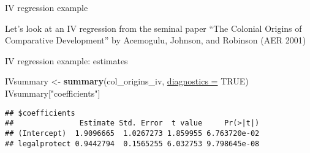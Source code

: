 \documentclass[ignorenonframetext,]{beamer}
\newenvironment{Shaded}{\begin{snugshade}}{\end{snugshade}}
\newcommand{\KeywordTok}[1]{\textcolor[rgb]{0.26,0.66,0.93}{\textbf{#1}}}
\newcommand{\DataTypeTok}[1]{\textcolor[rgb]{0.74,0.68,0.62}{\underline{#1}}}
\newcommand{\DecValTok}[1]{\textcolor[rgb]{0.27,0.67,0.26}{#1}}
\newcommand{\StringTok}[1]{\textcolor[rgb]{0.02,0.61,0.04}{#1}}
\newcommand{\OtherTok}[1]{\textcolor[rgb]{0.74,0.68,0.62}{#1}}
\newcommand{\OperatorTok}[1]{\textcolor[rgb]{0.74,0.68,0.62}{#1}}
\newcommand{\NormalTok}[1]{\textcolor[rgb]{0.74,0.68,0.62}{#1}}
\begin{document}
\begin{frame}[fragile]{IV regression example}

Let's look at an IV regression from the seminal paper ``The Colonial
Origins of Comparative Development'' by Acemogulu, Johnson, and Robinson
(AER 2001)

\begin{Shaded}
\end{Shaded}

\end{frame}

\begin{frame}[fragile]{IV regression example: estimates}

\begin{Shaded}
\begin{Highlighting}[]
\NormalTok{IVsummary <-}\StringTok{ }\KeywordTok{summary}\NormalTok{(col_origins_iv, }\DataTypeTok{diagnostics =} \OtherTok{TRUE}\NormalTok{)}
\NormalTok{IVsummary[}\StringTok{"coefficients"}\NormalTok{]}
\end{Highlighting}
\end{Shaded}

\begin{verbatim}
## $coefficients
##               Estimate Std. Error  t value     Pr(>|t|)
## (Intercept)  1.9096665  1.0267273 1.859955 6.763720e-02
## legalprotect 0.9442794  0.1565255 6.032753 9.798645e-08
\end{verbatim}

\end{frame}
\end{document}
